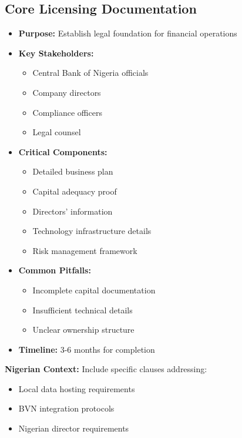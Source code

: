 \subsection{Core Licensing Documentation}
\begin{tcolorbox}[colback=white,colframe=primarydark,title=\textbf{CBN License Application Package}]
\begin{itemize}
    \item \textbf{Purpose:} Establish legal foundation for financial operations
    \item \textbf{Key Stakeholders:}
    \begin{itemize}
        \item Central Bank of Nigeria officials
        \item Company directors
        \item Compliance officers
        \item Legal counsel
    \end{itemize}
    \item \textbf{Critical Components:}
    \begin{itemize}
        \item Detailed business plan
        \item Capital adequacy proof
        \item Directors' information
        \item Technology infrastructure details
        \item Risk management framework
    \end{itemize}
    \item \textbf{Common Pitfalls:}
    \begin{itemize}
        \item Incomplete capital documentation
        \item Insufficient technical details
        \item Unclear ownership structure
    \end{itemize}
    \item \textbf{Timeline:} 3-6 months for completion
\end{itemize}

\textbf{Nigerian Context:}
Include specific clauses addressing:
\begin{itemize}
    \item Local data hosting requirements
    \item BVN integration protocols
    \item Nigerian director requirements
\end{itemize}
\end{tcolorbox}

